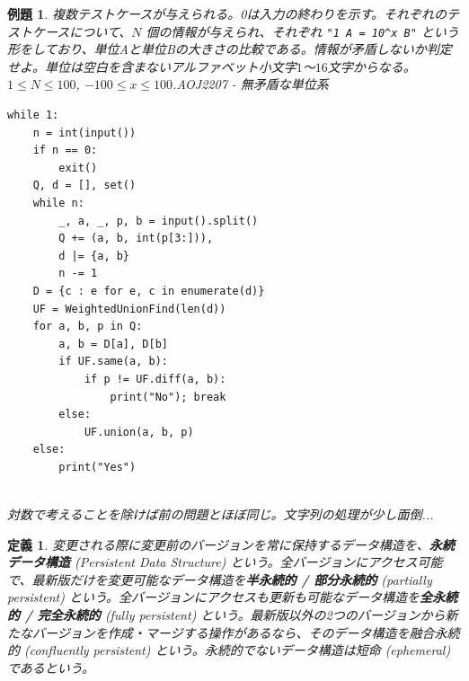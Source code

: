 \documentclass[12pt, a4j]{ltjsarticle}
\newtheorem{defi}[thm]{定義}
\newtheorem{exm}[thm]{例題}
\newcommand*{\SS}{\vspace{1cm}}
\begin{document}
\SS

\begin{exm}\upshape 複数テストケースが与えられる。0は入力の終わりを示す。それぞれのテストケースについて、$N$ 個の情報が与えられ、それぞれ \lstinline{"1 A = 10^x B"} という形をしており、単位Aと単位Bの大きさの比較である。情報が矛盾しないか判定せよ。単位は空白を含まないアルファベット小文字$1$〜$16$文字からなる。$1\le N\le 100$, $-100\le x\le 100$.\quad AOJ2207 - 無矛盾な単位系\\
\begin{lstlisting}
while 1:
    n = int(input())
    if n == 0:
        exit()
    Q, d = [], set()
    while n:
        _, a, _, p, b = input().split()
        Q += (a, b, int(p[3:])),
        d |= {a, b}
        n -= 1
    D = {c : e for e, c in enumerate(d)}
    UF = WeightedUnionFind(len(d))
    for a, b, p in Q:
        a, b = D[a], D[b]
        if UF.same(a, b):
            if p != UF.diff(a, b):
                print("No"); break
        else:
            UF.union(a, b, p)
    else:
        print("Yes")
\end{lstlisting}\quad\\
対数で考えることを除けば前の問題とほぼ同じ。文字列の処理が少し面倒...
\end{exm}

\SS

\begin{defi}
変更される際に変更前のバージョンを常に保持するデータ構造を、{\bf 永続データ構造} (Persistent Data Structure) という。全バージョンにアクセス可能で、最新版だけを変更可能なデータ構造を{\bf 半永続的 / 部分永続的} (partially persistent) という。全バージョンにアクセスも更新も可能なデータ構造を{\bf 全永続的 / 完全永続的} (fully persistent) という。最新版以外の2つのバージョンから新たなバージョンを作成・マージする操作があるなら、そのデータ構造を融合永続的 (confluently persistent) という。永続的でないデータ構造は短命 (ephemeral) であるという。
\end{defi}

\SS
\end{document}
